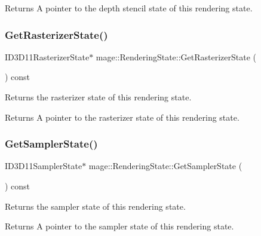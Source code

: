\begin{DoxyReturn}{Returns}
A pointer to the depth stencil state of this rendering state. 
\end{DoxyReturn}
\hypertarget{structmage_1_1_rendering_state_a46b7f58a95f8029598d8354fdf02840f}{}\label{structmage_1_1_rendering_state_a46b7f58a95f8029598d8354fdf02840f} 
\subsubsection{\texorpdfstring{Get\+Rasterizer\+State()}{GetRasterizerState()}}
{\footnotesize\ttfamily I\+D3\+D11\+Rasterizer\+State$\ast$ mage\+::\+Rendering\+State\+::\+Get\+Rasterizer\+State (\begin{DoxyParamCaption}{ }\end{DoxyParamCaption}) const\hspace{0.3cm}{\ttfamily [noexcept]}}

Returns the rasterizer state of this rendering state.

\begin{DoxyReturn}{Returns}
A pointer to the rasterizer state of this rendering state. 
\end{DoxyReturn}
\hypertarget{structmage_1_1_rendering_state_a72a0817f0041d49af156f8115347460d}{}\label{structmage_1_1_rendering_state_a72a0817f0041d49af156f8115347460d} 
\subsubsection{\texorpdfstring{Get\+Sampler\+State()}{GetSamplerState()}}
{\footnotesize\ttfamily I\+D3\+D11\+Sampler\+State$\ast$ mage\+::\+Rendering\+State\+::\+Get\+Sampler\+State (\begin{DoxyParamCaption}{ }\end{DoxyParamCaption}) const\hspace{0.3cm}{\ttfamily [noexcept]}}

Returns the sampler state of this rendering state.

\begin{DoxyReturn}{Returns}
A pointer to the sampler state of this rendering state. 
\end{DoxyReturn}
\hypertarget{structmage_1_1_rendering_state_af03ad38dd9b88949fc9d3603e4829c26}{}\label{structmage_1_1_rendering_state_af03ad38dd9b88949fc9d3603e4829c26} 
